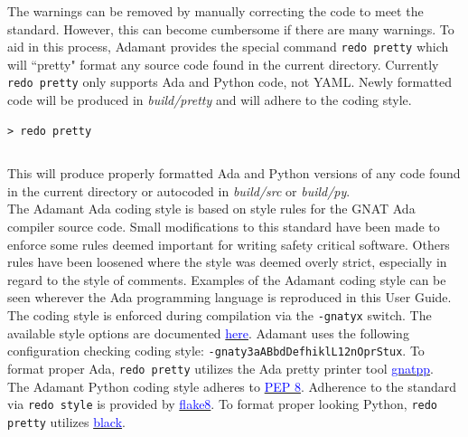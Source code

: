 The warnings can be removed by manually correcting the code to meet the standard. However, this can become cumbersome if there are many warnings. To aid in this process, Adamant provides the special command \texttt{redo pretty} which will ``pretty" format any source code found in the current directory. Currently \texttt{redo pretty} only supports Ada and Python code, not YAML. Newly formatted code will be produced in \textit{build/pretty} and will adhere to the coding style.

\vspace{5mm} %
\begin{verbatim}
> redo pretty
\end{verbatim}
\inputminted{text}{../example_architecture/style_demo/output3.txt}
\vspace{5mm} %

This will produce properly formatted Ada and Python versions of any code found in the current directory or autocoded in \textit{build/src} or \textit{build/py}. \\

The Adamant Ada coding style is based on style rules for the GNAT Ada compiler source code. Small modifications to this standard have been made to enforce some rules deemed important for writing safety critical software. Others rules have been loosened where the style was deemed overly strict, especially in regard to the style of comments. Examples of the Adamant coding style can be seen wherever the Ada programming language is reproduced in this User Guide. The coding style is enforced during compilation via the \texttt{-gnatyx} switch. The available style options are documented \href{https://gcc.gnu.org/onlinedocs/gnat_ugn/Style-Checking.html}{\textcolor{blue}{here}}. Adamant uses the following configuration checking coding style: \texttt{-gnaty3aABbdDefhiklL12nOprStux}. To format proper Ada, \texttt{redo pretty} utilizes the Ada pretty printer tool \href{https://gcc.gnu.org/onlinedocs/gcc-4.3.2/gnat_ugn_unw/The-GNAT-Pretty_002dPrinter-gnatpp.html}{\textcolor{blue}{gnatpp}}. \\

The Adamant Python coding style adheres to \href{https://peps.python.org/pep-0008/}{\textcolor{blue}{PEP 8}}. Adherence to the standard via \texttt{redo style} is provided by \href{https://flake8.pycqa.org/en/latest/}{\textcolor{blue}{flake8}}. To format proper looking Python, \texttt{redo pretty} utilizes \href{https://black.readthedocs.io/en/stable/index.html}{\textcolor{blue}{black}}. \\


